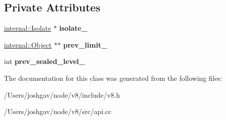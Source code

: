 \subsection*{Private Attributes}
\begin{DoxyCompactItemize}
\item 
\hyperlink{classv8_1_1internal_1_1_isolate}{internal\+::\+Isolate} $\ast$ {\bfseries isolate\+\_\+}\hypertarget{classv8_1_1_seal_handle_scope_a11eec9b548caf6a6e6b1ff124438da5f}{}\label{classv8_1_1_seal_handle_scope_a11eec9b548caf6a6e6b1ff124438da5f}

\item 
\hyperlink{classv8_1_1internal_1_1_object}{internal\+::\+Object} $\ast$$\ast$ {\bfseries prev\+\_\+limit\+\_\+}\hypertarget{classv8_1_1_seal_handle_scope_a961f11f0c68251029b03a55a3724484a}{}\label{classv8_1_1_seal_handle_scope_a961f11f0c68251029b03a55a3724484a}

\item 
int {\bfseries prev\+\_\+sealed\+\_\+level\+\_\+}\hypertarget{classv8_1_1_seal_handle_scope_a070f75eb0735b4b0bf7b29d69e6b4e21}{}\label{classv8_1_1_seal_handle_scope_a070f75eb0735b4b0bf7b29d69e6b4e21}

\end{DoxyCompactItemize}


The documentation for this class was generated from the following files\+:\begin{DoxyCompactItemize}
\item 
/\+Users/joshgav/node/v8/include/v8.\+h\item 
/\+Users/joshgav/node/v8/src/api.\+cc\end{DoxyCompactItemize}
